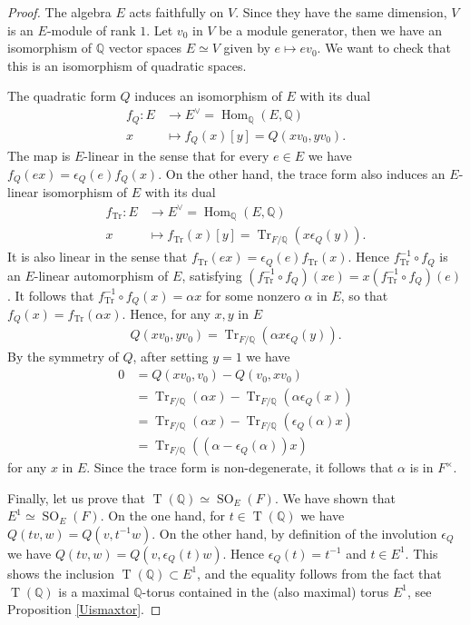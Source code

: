 \documentclass[11pt]{article} %
\newcommand{\8}{\infty}
\newcommand{\Tbf}{\operatorname{T}}
\newcommand{\SO}{\operatorname{SO}}
\newcommand{\Q}{\mathbb{Q}}
\newcommand{\Hom}{\operatorname{Hom}}
\newcommand{\Tr}{\operatorname{Tr}}
\theoremstyle{mytheoremstyle}
\theoremstyle{remark}
\numberwithin{equation}{section}
\begin{document}
\begin{proof}
    The algebra $E$ acts faithfully on $V$. Since they have the same dimension, $V$ is an $E$-module of rank $1$. Let $v_0$ in $V$ be a module generator, then we have an isomorphism of $\Q$ vector spaces $E \simeq V$ given by $e \mapsto ev_0$. We want to check that this is an isomorphism of quadratic spaces.
    
    
    The quadratic form $Q$ induces an isomorphism of $E$ with its dual
    \begin{align}
        f_Q \colon E & \longrightarrow E^\vee=\Hom_\Q(E,\Q) \nonumber \\
        x & \longmapsto f_Q(x)[y]=Q(xv_0,yv_0).
    \end{align}
    The map is $E$-linear in the sense that for every $e \in E$ we have $f_Q(ex)=\epsilon_Q(e)f_Q(x)$.
     On the other hand, the trace form also induces an $E$-linear isomorphism of $E$ with its dual
    \begin{align}
        f_{\Tr} \colon E & \longrightarrow E^\vee=\Hom_\Q(E,\Q) \nonumber \\
        x & \longmapsto f_{\Tr}(x)[y]=\Tr_{F /\Q}(x\epsilon_Q(y)).
    \end{align}
    It is also linear in the sense that $f_{\Tr}(ex)=\epsilon_Q(e)f_{\Tr}(x)$.
    Hence $f_{\Tr}^{-1} \circ f_Q$ is an $E$-linear automorphism of $E$, satisfying $(f_{\Tr}^{-1} \circ f_Q)(xe)=x(f_{\Tr}^{-1} \circ f_Q)(e)$. It follows that $f_{\Tr}^{-1} \circ f_Q(x)=\alpha x$ for some nonzero $\alpha$ in $E$, so that $f_Q(x)=f_{\Tr}(\alpha x)$. Hence, for any $x,y$ in $E$
    \begin{align}
     Q(xv_0,yv_0) = \Tr_{F /\Q}(\alpha x\epsilon_Q(y)).  
    \end{align}
    By the symmetry of $Q$, after setting $y=1$ we have
    \begin{align}
        0 & = Q(xv_0,v_0)-Q(v_0,xv_0) \nonumber \\
        & = \Tr_{F /\Q}(\alpha x)-\Tr_{F /\Q}(\alpha \epsilon_Q(x)) \nonumber \\
        & = \Tr_{F /\Q}(\alpha x)-\Tr_{F /\Q}(\epsilon_Q(\alpha) x) \nonumber \\
        & = \Tr_{F /\Q}((\alpha-\epsilon_Q(\alpha))x)
    \end{align}
    for any $x$ in $E$. Since the trace form is non-degenerate, it follows that $\alpha$ is in $F^\times$.

    Finally, let us prove that $\Tbf(\Q) \simeq \SO_E(F)$. We have shown that $E^1 \simeq \SO_E(F)$. On the one hand, for $t \in \Tbf(\Q)$ we have $Q(tv,w)=Q(v,t^{-1}w)$. On the other hand, by definition of the involution $\epsilon_Q$ we have $Q(tv,w)=Q(v,\epsilon_Q(t)w)$. Hence $\epsilon_Q(t)=t^{-1}$ and $t \in E^1$. This shows the inclusion $\Tbf(\Q) \subset E^1$, and the equality follows from the fact that $\Tbf(\Q)$ is a maximal $\Q$-torus contained in the (also maximal) torus $E^1$, see Proposition \ref{Uismaxtor}.
\end{proof}
\end{document}
